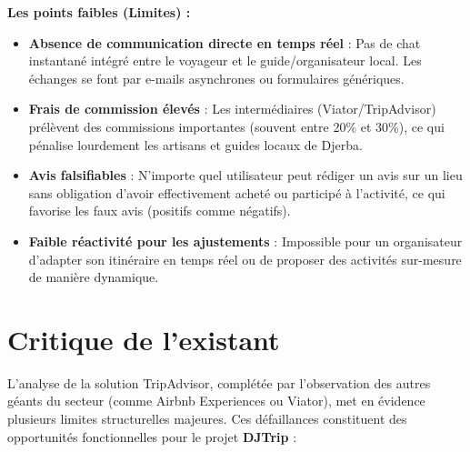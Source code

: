 \documentclass[12pt,a4paper]{report}
\begin{document}
\noindent\textbf{Les points faibles (Limites) :}
\begin{itemize}[label=\textbf{--}]
    \item \textbf{Absence de communication directe en temps réel} : Pas de chat instantané intégré entre le voyageur et le guide/organisateur local. Les échanges se font par e-mails asynchrones ou formulaires génériques.
    \item \textbf{Frais de commission élevés} : Les intermédiaires (Viator/TripAdvisor) prélèvent des commissions importantes (souvent entre 20\% et 30\%), ce qui pénalise lourdement les artisans et guides locaux de Djerba.
    \item \textbf{Avis falsifiables} : N'importe quel utilisateur peut rédiger un avis sur un lieu sans obligation d'avoir effectivement acheté ou participé à l'activité, ce qui favorise les faux avis (positifs comme négatifs).
    \item \textbf{Faible réactivité pour les ajustements} : Impossible pour un organisateur d'adapter son itinéraire en temps réel ou de proposer des activités sur-mesure de manière dynamique.
\end{itemize}

\section{Critique de l'existant}
L’analyse de la solution TripAdvisor, complétée par l'observation des autres géants du secteur (comme Airbnb Experiences ou Viator), met en évidence plusieurs limites structurelles majeures. Ces défaillances constituent des opportunités fonctionnelles pour le projet \textbf{DJTrip} :
\end{document}
